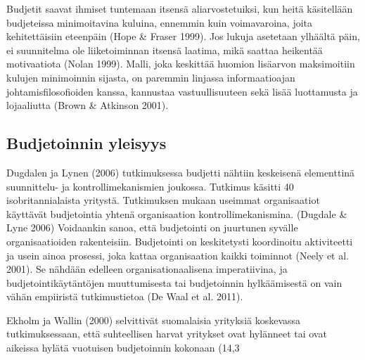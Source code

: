 \documentclass[12pt,a4paper,oneside,pdftex]{report}
\begin{document}
Budjetit saavat ihmiset tuntemaan itsensä aliarvostetuiksi, kun heitä käsitellään budjeteissa minimoitavina kuluina, ennemmin kuin voimavaroina, joita kehitettäisiin eteenpäin (Hope & Fraser 1999). Jos lukuja asetetaan ylhäältä päin, ei suunnitelma ole liiketoiminnan itsensä laatima, mikä saattaa heikentää motivaatiota (Nolan 1999). Malli, joka keskittää huomion lisäarvon maksimoitiin kulujen minimoinnin sijasta, on paremmin linjassa informaatioajan johtamisfilosofioiden kanssa, kannustaa vastuullisuuteen sekä lisää luottamusta ja lojaaliutta (Brown & Atkinson 2001).

\subsection{Budjetoinnin yleisyys}

Dugdalen ja Lynen (2006) tutkimuksessa budjetti nähtiin keskeisenä elementtinä suunnittelu- ja kontrollimekanismien joukossa. Tutkimus käsitti 40 isobritannialaista yritystä. Tutkimuksen mukaan useimmat organisaatiot käyttävät budjetointia yhtenä organisaation kontrollimekanismina. (Dugdale & Lyne 2006) Voidaankin sanoa, että budjetointi on juurtunen syvälle organisaatioiden rakenteisiin. Budjetointi on keskitetysti koordinoitu aktiviteetti ja usein ainoa prosessi, joka kattaa organisaation kaikki toiminnot (Neely et al. 2001). Se nähdään edelleen organisationaalisena imperatiivina, ja budjetointikäytäntöjen muuttumisesta tai budjetoinnin hylkäämisestä on vain vähän empiiristä tutkimustietoa (De Waal et al. 2011).

Ekholm ja Wallin (2000) selvittivät suomalaisia yrityksiä koskevassa tutkimuksessaan, että suhteellisen harvat yritykset ovat hylänneet tai ovat aikeissa hylätä vuotuisen budjetoinnin kokonaan (14,3 %
\end{document}
